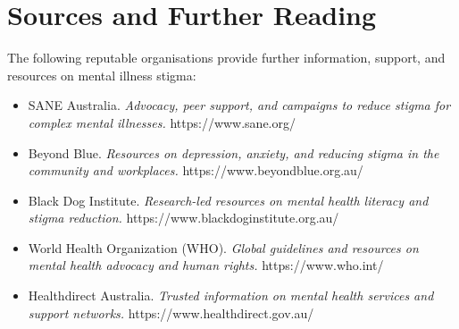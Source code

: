 \section*{Sources and Further Reading}
The following reputable organisations provide further information, support, and resources on mental illness stigma:
\begin{itemize}
    \item SANE Australia. \textit{Advocacy, peer support, and campaigns to reduce stigma for complex mental illnesses.} https://www.sane.org/
    \item Beyond Blue. \textit{Resources on depression, anxiety, and reducing stigma in the community and workplaces.} https://www.beyondblue.org.au/
    \item Black Dog Institute. \textit{Research-led resources on mental health literacy and stigma reduction.} https://www.blackdoginstitute.org.au/
    \item World Health Organization (WHO). \textit{Global guidelines and resources on mental health advocacy and human rights.} https://www.who.int/
    \item Healthdirect Australia. \textit{Trusted information on mental health services and support networks.} https://www.healthdirect.gov.au/
\end{itemize}
